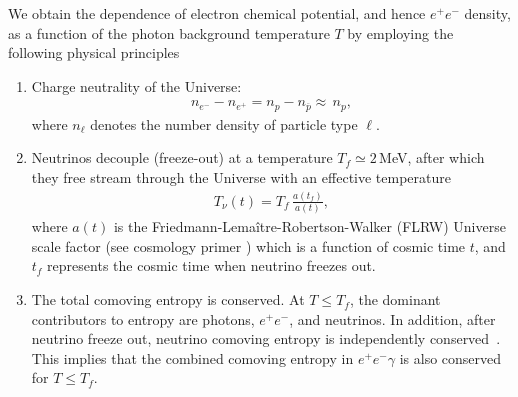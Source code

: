 
We obtain the dependence of electron chemical potential, and hence $e^+e^-$ density, as a function of the photon background temperature $T$ by employing the following physical principles
\begin{enumerate}
\item Charge neutrality of the Universe:
\begin{align}\label{neutrality}
n_{e^-}-n_{{e^+}}=n_p-n_{\overline{p}}\approx\,n_p,
\end{align}
where $n_\ell$ denotes the number density of particle type $\ell$.
\item Neutrinos decouple (freeze-out) at a temperature $T_f\simeq 2$\,MeV, after which they free stream through the Universe with an effective temperature~\cite{Birrell:2012gg}
\begin{align}
 T_\nu(t)=T_f\,\frac{a(t_f)}{a(t)},
\end{align}
where $a(t)$ is the Friedmann-Lema\^{i}tre-Robertson-Walker (FLRW) Universe scale factor (see cosmology primer ) which is a function of cosmic time $t$, and $t_f$ represents the cosmic time when neutrino freezes out.
\item The total comoving entropy is conserved. At $T\leq T_f$, the dominant contributors to entropy are photons, $e^+e^-$, and neutrinos. In addition, after neutrino freeze out, neutrino comoving entropy is independently conserved~\cite{Birrell:2012gg}. This implies that the combined comoving entropy in $e^+e^-\gamma$ is also conserved for $T\leq T_f$.
\end{enumerate} 
